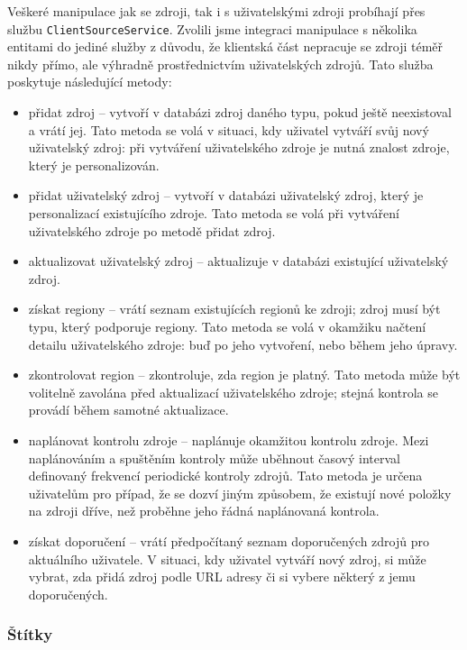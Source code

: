 Veškeré manipulace jak se zdroji, tak i s uživatelskými zdroji probíhají přes službu \verb|ClientSourceService|.
Zvolili jsme integraci manipulace s několika entitami do jediné služby z důvodu, že klientská část nepracuje se zdroji téměř nikdy přímo, ale výhradně prostřednictvím uživatelských zdrojů.
Tato služba poskytuje následující metody:
\begin{itemize}
	\item přidat zdroj -- vytvoří v databázi zdroj daného typu, pokud ještě neexistoval a vrátí jej.
		Tato metoda se volá v situaci, kdy uživatel vytváří svůj nový uživatelský zdroj: při vytváření uživatelského zdroje je nutná znalost zdroje, který je personalizován.
	\item přidat uživatelský zdroj -- vytvoří v databázi uživatelský zdroj, který je personalizací existujícího zdroje.
		Tato metoda se volá při vytváření uživatelského zdroje po metodě přidat zdroj.
	\item aktualizovat uživatelský zdroj -- aktualizuje v databázi existující uživatelský zdroj.
	\item získat regiony -- vrátí seznam existujících regionů ke zdroji; zdroj musí být typu, který podporuje regiony.
		Tato metoda se volá v okamžiku načtení detailu uživatelského zdroje: buď po jeho vytvoření, nebo během jeho úpravy.
	\item zkontrolovat region -- zkontroluje, zda region je platný.
		Tato metoda může být volitelně zavolána před aktualizací uživatelského zdroje; stejná kontrola se provádí během samotné aktualizace.
	\item naplánovat kontrolu zdroje -- naplánuje okamžitou kontrolu zdroje.
		Mezi naplánováním a spuštěním kontroly může uběhnout časový interval definovaný frekvencí periodické kontroly zdrojů.
		Tato metoda je určena uživatelům pro případ, že se dozví jiným způsobem, že existují nové položky na zdroji dříve, než proběhne jeho řádná naplánovaná kontrola.
	\item získat doporučení -- vrátí předpočítaný seznam doporučených zdrojů pro aktuálního uživatele.
		V situaci, kdy uživatel vytváří nový zdroj, si může vybrat, zda přidá zdroj podle URL adresy či si vybere některý z jemu doporučených.
\end{itemize}

\subsubsection{Štítky}

